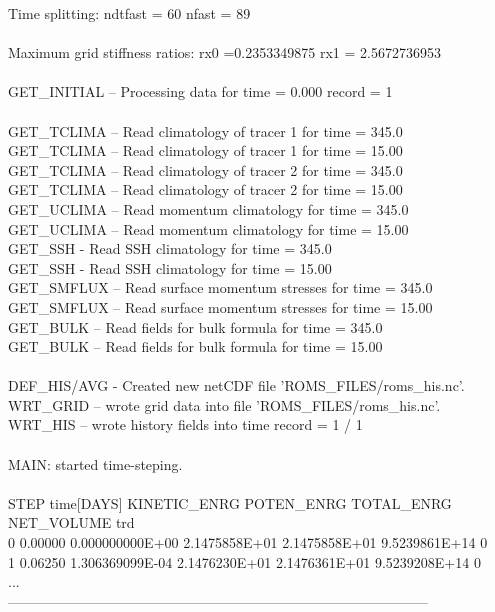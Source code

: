 Time splitting: ndtfast = 60    nfast = 89\\
\\
 Maximum grid stiffness ratios:   rx0 =0.2353349875  rx1 =  2.5672736953\\
\\
      GET\_INITIAL -- Processing data for time =   0.000     record =   1\\
\\
      GET\_TCLIMA -- Read climatology of tracer   1 for time =    345.0 \\   
      GET\_TCLIMA -- Read climatology of tracer   1 for time =    15.00 \\   
      GET\_TCLIMA -- Read climatology of tracer   2 for time =    345.0 \\   
      GET\_TCLIMA -- Read climatology of tracer   2 for time =    15.00 \\   
      GET\_UCLIMA -- Read momentum climatology      for time =    345.0 \\   
      GET\_UCLIMA -- Read momentum climatology      for time =    15.00 \\   
      GET\_SSH     - Read SSH climatology           for time =    345.0 \\   
      GET\_SSH     - Read SSH climatology           for time =    15.00 \\   
      GET\_SMFLUX -- Read surface momentum stresses for time =    345.0 \\   
      GET\_SMFLUX -- Read surface momentum stresses for time =    15.00 \\   
      GET\_BULK   -- Read fields for bulk formula   for time =    345.0 \\   
      GET\_BULK   -- Read fields for bulk formula   for time =    15.00 \\   
\\
      DEF\_HIS/AVG - Created new netCDF file 'ROMS\_FILES/roms\_his.nc'.\\
      WRT\_GRID -- wrote grid data into file 'ROMS\_FILES/roms\_his.nc'.\\
      WRT\_HIS -- wrote history fields into time record =   1 /   1\\
\\
 MAIN: started time-steping.\\
\\
 STEP   time[DAYS] KINETIC\_ENRG    POTEN\_ENRG    TOTAL\_ENRG    NET\_VOLUME   trd\\
     0     0.00000 0.000000000E+00 2.1475858E+01 2.1475858E+01 9.5239861E+14  0\\
     1     0.06250 1.306369099E-04 2.1476230E+01 2.1476361E+01 9.5239208E+14  0\\
...\\
------------------------------------------------------------------------------------------\\

